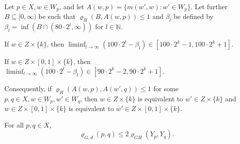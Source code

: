\documentclass[10pt,a4paper]{amsart}
\begin{document}
\begin{claim} \label{cl5}
Let $ p \in X, w \in W_{p} $, and let $ A(w, p) = \{ m(w', w) : w' \in W_{p} \} $. Let further $ B \subseteq [0, \infty) $ be such that $ \varrho_{H}(B, A(w, p)) \leq 1 $ and $ \beta_{l} $ be defined by $ \beta_{l} = \inf (B \cap (80 \cdot 2^{l}, \infty)) $ for $ l \in \mathbb{N} $.

If $ w \in Z \times \{ k \} $, then $ \liminf_{l \to \infty} (100 \cdot 2^{l} - \beta_{l}) \in [100 \cdot 2^{k} - 1, 100 \cdot 2^{k} + 1] $.

If $ w \in Z \times [0, 1] \times \{ k \} $, then $ \liminf_{l \to \infty} (100 \cdot 2^{l} - \beta_{l}) \in [90 \cdot 2^{k} - 2, 90 \cdot 2^{k} + 1] $.

Consequently, if $ \varrho_{H}(A(w, p), A(w', q)) \leq 1 $ for some $ p, q \in X, w \in W_{p}, w' \in W_{q} $, then $ w \in Z \times \{ k \} $ is equivalent to $ w' \in Z \times \{ k \} $ and $ w \in Z \times [0, 1] \times \{ k \} $ is equivalent to $ w' \in Z \times [0, 1] \times \{ k \} $.
\end{claim}

\begin{claim} \label{cl6}
For all $ p, q \in X $,
$$ \varrho_{G, d}(p, q) \leq 2 \varrho_{GH}(Y_{p}, Y_{q}). $$
\end{claim}
\end{document}
